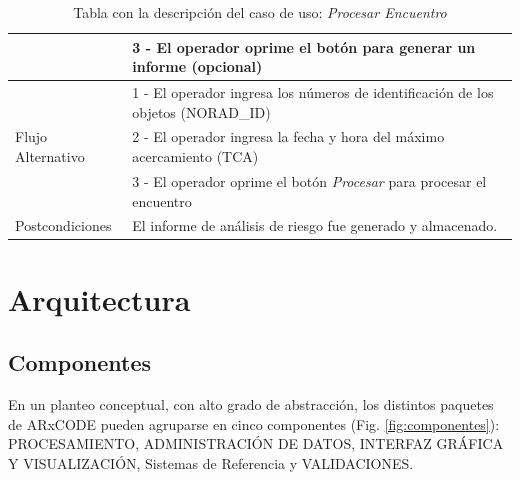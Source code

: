 \begin{table}[h]
{\begin{tabular}[c]{|l|l|}
& 3 - El operador oprime el bot\'on para generar un informe (opcional)\\
\hline
\multirow{ 3}{*}{Flujo Alternativo} & 1 - El operador ingresa los n\'umeros de identificaci\'on de los objetos (NORAD\_ID) \\
& 2 - El operador ingresa la fecha y hora del m\'aximo acercamiento (TCA)\\
& 3 - El operador oprime el bot\'on {\it{Procesar}} para procesar el encuentro\\
\hline
Postcondiciones & El informe de an\'alisis de riesgo fue generado y almacenado.\\
\hline
\end{tabular}}
\caption[Caso de Uso: Procesar Encuentro]{Tabla con la descripci\'on del caso de uso: \it{Procesar Encuentro}}
\label{tab:usoproceso}
\end{table}


\section{Arquitectura}

\subsection*{Componentes}\label{subsec:componentes}
En un planteo conceptual, con alto grado de abstracci\'on, los distintos paquetes de ARxCODE pueden agruparse en cinco componentes (Fig.  \ref{fig:componentes}): PROCESAMIENTO, ADMINISTRACI\'ON DE DATOS, INTERFAZ GR\'AFICA Y VISUALIZACI\'ON, Sistemas de Referencia y VALIDACIONES.\\

